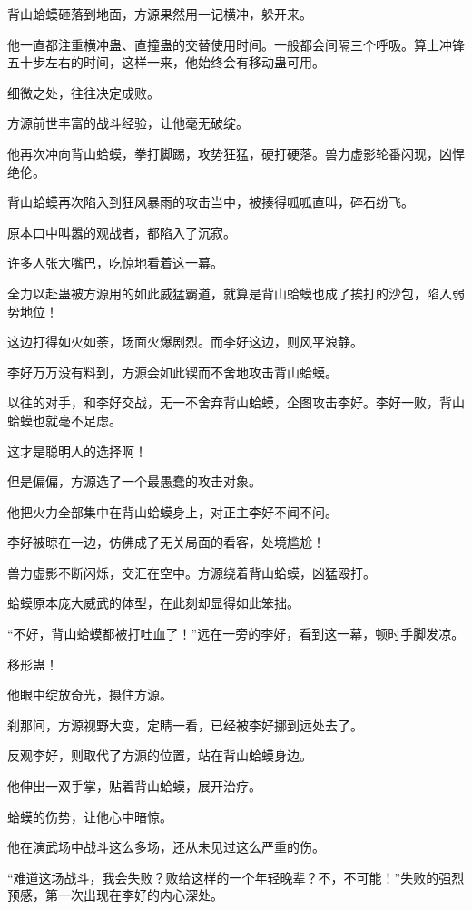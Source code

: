 \begin{this_body}
背山蛤蟆砸落到地面，方源果然用一记横冲，躲开来。

他一直都注重横冲蛊、直撞蛊的交替使用时间。一般都会间隔三个呼吸。算上冲锋五十步左右的时间，这样一来，他始终会有移动蛊可用。

细微之处，往往决定成败。

方源前世丰富的战斗经验，让他毫无破绽。

他再次冲向背山蛤蟆，拳打脚踢，攻势狂猛，硬打硬落。兽力虚影轮番闪现，凶悍绝伦。

背山蛤蟆再次陷入到狂风暴雨的攻击当中，被揍得呱呱直叫，碎石纷飞。

原本口中叫嚣的观战者，都陷入了沉寂。

许多人张大嘴巴，吃惊地看着这一幕。

全力以赴蛊被方源用的如此威猛霸道，就算是背山蛤蟆也成了挨打的沙包，陷入弱势地位！

这边打得如火如荼，场面火爆剧烈。而李好这边，则风平浪静。

李好万万没有料到，方源会如此锲而不舍地攻击背山蛤蟆。

以往的对手，和李好交战，无一不舍弃背山蛤蟆，企图攻击李好。李好一败，背山蛤蟆也就毫不足虑。

这才是聪明人的选择啊！

但是偏偏，方源选了一个最愚蠢的攻击对象。

他把火力全部集中在背山蛤蟆身上，对正主李好不闻不问。

李好被晾在一边，仿佛成了无关局面的看客，处境尴尬！

兽力虚影不断闪烁，交汇在空中。方源绕着背山蛤蟆，凶猛殴打。

蛤蟆原本庞大威武的体型，在此刻却显得如此笨拙。

“不好，背山蛤蟆都被打吐血了！”远在一旁的李好，看到这一幕，顿时手脚发凉。

移形蛊！

他眼中绽放奇光，摄住方源。

刹那间，方源视野大变，定睛一看，已经被李好挪到远处去了。

反观李好，则取代了方源的位置，站在背山蛤蟆身边。

他伸出一双手掌，贴着背山蛤蟆，展开治疗。

蛤蟆的伤势，让他心中暗惊。

他在演武场中战斗这么多场，还从未见过这么严重的伤。

“难道这场战斗，我会失败？败给这样的一个年轻晚辈？不，不可能！”失败的强烈预感，第一次出现在李好的内心深处。


\end{this_body}
